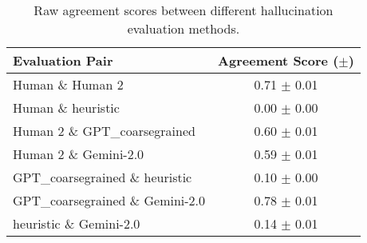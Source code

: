 \begin{table}[ht]
\centering
\tiny
\begin{tabular}{lc}
\toprule
\textbf{Evaluation Pair} & \textbf{Agreement Score ($\pm$)} \\
\midrule
Human \& Human 2 & 0.71 $\pm$ 0.01 \\
Human \& heuristic & 0.00 $\pm$ 0.00 \\
Human 2 \& GPT\_coarsegrained & 0.60 $\pm$ 0.01 \\
Human 2 \& Gemini-2.0 & 0.59 $\pm$ 0.01 \\
GPT\_coarsegrained \& heuristic & 0.10 $\pm$ 0.00 \\
GPT\_coarsegrained \& Gemini-2.0 & 0.78 $\pm$ 0.01 \\
heuristic \& Gemini-2.0 & 0.14 $\pm$ 0.01 \\
\bottomrule
\end{tabular}
\caption{Raw agreement scores between different hallucination evaluation methods.}
\label{tab:agreement_scores}
\end{table}